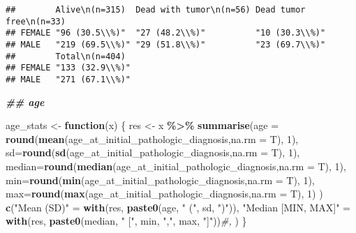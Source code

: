 \documentclass[
]{article}
\newenvironment{Shaded}{\begin{snugshade}}{\end{snugshade}}
\newcommand{\AttributeTok}[1]{\textcolor[rgb]{0.13,0.29,0.53}{#1}}
\newcommand{\CommentTok}[1]{\textcolor[rgb]{0.56,0.35,0.01}{\textit{#1}}}
\newcommand{\ControlFlowTok}[1]{\textcolor[rgb]{0.13,0.29,0.53}{\textbf{#1}}}
\newcommand{\DecValTok}[1]{\textcolor[rgb]{0.00,0.00,0.81}{#1}}
\newcommand{\DocumentationTok}[1]{\textcolor[rgb]{0.56,0.35,0.01}{\textbf{\textit{#1}}}}
\newcommand{\FunctionTok}[1]{\textcolor[rgb]{0.13,0.29,0.53}{\textbf{#1}}}
\newcommand{\NormalTok}[1]{#1}
\newcommand{\OtherTok}[1]{\textcolor[rgb]{0.56,0.35,0.01}{#1}}
\newcommand{\SpecialCharTok}[1]{\textcolor[rgb]{0.81,0.36,0.00}{\textbf{#1}}}
\newcommand{\StringTok}[1]{\textcolor[rgb]{0.31,0.60,0.02}{#1}}
\begin{document}
\begin{verbatim}
##        Alive\n(n=315)  Dead with tumor\n(n=56) Dead tumor free\n(n=33)
## FEMALE "96 (30.5\\%)"  "27 (48.2\\%)"          "10 (30.3\\%)"         
## MALE   "219 (69.5\\%)" "29 (51.8\\%)"          "23 (69.7\\%)"         
##        Total\n(n=404) 
## FEMALE "133 (32.9\\%)"
## MALE   "271 (67.1\\%)"
\end{verbatim}

\begin{Shaded}
\begin{Highlighting}[]
\DocumentationTok{\#\# age}

\NormalTok{age\_stats }\OtherTok{\textless{}{-}} \ControlFlowTok{function}\NormalTok{(x) \{}
\NormalTok{   res }\OtherTok{\textless{}{-}}\NormalTok{ x }\SpecialCharTok{\%\textgreater{}\%} \FunctionTok{summarise}\NormalTok{(}\AttributeTok{age =} \FunctionTok{round}\NormalTok{(}\FunctionTok{mean}\NormalTok{(age\_at\_initial\_pathologic\_diagnosis,}\AttributeTok{na.rm =}\NormalTok{ T), }\DecValTok{1}\NormalTok{), }
                \AttributeTok{sd=}\FunctionTok{round}\NormalTok{(}\FunctionTok{sd}\NormalTok{(age\_at\_initial\_pathologic\_diagnosis,}\AttributeTok{na.rm =}\NormalTok{ T), }\DecValTok{1}\NormalTok{),}
                \AttributeTok{median=}\FunctionTok{round}\NormalTok{(}\FunctionTok{median}\NormalTok{(age\_at\_initial\_pathologic\_diagnosis,}\AttributeTok{na.rm =}\NormalTok{ T), }\DecValTok{1}\NormalTok{),}
                \AttributeTok{min=}\FunctionTok{round}\NormalTok{(}\FunctionTok{min}\NormalTok{(age\_at\_initial\_pathologic\_diagnosis,}\AttributeTok{na.rm =}\NormalTok{ T), }\DecValTok{1}\NormalTok{),}
                \AttributeTok{max=}\FunctionTok{round}\NormalTok{(}\FunctionTok{max}\NormalTok{(age\_at\_initial\_pathologic\_diagnosis,}\AttributeTok{na.rm =}\NormalTok{ T), }\DecValTok{1}\NormalTok{)}
\NormalTok{                )}
   \FunctionTok{c}\NormalTok{(}\StringTok{"Mean (SD)"} \OtherTok{=} \FunctionTok{with}\NormalTok{(res, }\FunctionTok{paste0}\NormalTok{(age, }\StringTok{" ("}\NormalTok{, sd, }\StringTok{")"}\NormalTok{)),}
       \StringTok{"Median [MIN, MAX]"} \OtherTok{=} \FunctionTok{with}\NormalTok{(res, }\FunctionTok{paste0}\NormalTok{(median, }\StringTok{" ["}\NormalTok{, min, }\StringTok{","}\NormalTok{, max, }\StringTok{"]"}\NormalTok{))}\CommentTok{\#,}
\NormalTok{   )             }
\NormalTok{\}}


\end{Highlighting}
\end{Shaded}
\end{document}

